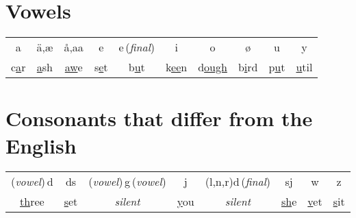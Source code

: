 \section*{Vowels}

\begin{tabular}{cccccccccc}
a & \"a,\ae & \aa,aa & e & e\,(\textit{final}) & i & o & \o & u & y \\
c\underline{a}r & \underline{a}sh & \underline{aw}e & s\underline{e}t & b\underline{u}t & k\underline{ee}n & d\underline{ough} & b\underline{i}rd & p\underline{u}t & \underline{u}til \\
\end{tabular}


\section*{Consonants that differ from the English}

\begin{tabular}{cccccccc}
(\textit{vowel})\,d & ds & (\textit{vowel})\,g\,(\textit{vowel}) & j & (l,n,r)d\,(\textit{final}) & sj & w & z \\
\underline{th}ree & \underline{s}et & \textit{silent} & \underline{y}ou & \textit{silent} & \underline{sh}e & \underline{v}et & \underline{s}it \\
\end{tabular}
